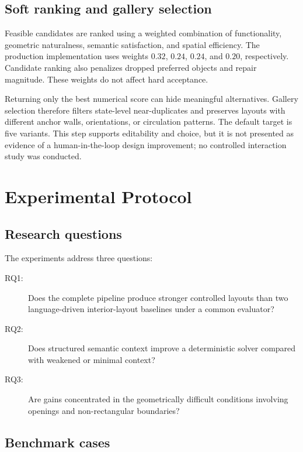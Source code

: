 \documentclass[pdflatex,sn-mathphys-num]{sn-jnl}
\begin{document}
\subsection{Soft ranking and gallery selection}

Feasible candidates are ranked using a weighted combination of functionality, geometric naturalness, semantic satisfaction, and spatial efficiency. The production implementation uses weights \(0.32\), \(0.24\), \(0.24\), and \(0.20\), respectively. Candidate ranking also penalizes dropped preferred objects and repair magnitude. These weights do not affect hard acceptance.

Returning only the best numerical score can hide meaningful alternatives. Gallery selection therefore filters state-level near-duplicates and preserves layouts with different anchor walls, orientations, or circulation patterns. The default target is five variants. This step supports editability and choice, but it is not presented as evidence of a human-in-the-loop design improvement; no controlled interaction study was conducted.

\section{Experimental Protocol}\label{sec:experiments}

\subsection{Research questions}

The experiments address three questions:

\begin{description}
  \item[RQ1:] Does the complete pipeline produce stronger controlled layouts than two language-driven interior-layout baselines under a common evaluator?
  \item[RQ2:] Does structured semantic context improve a deterministic solver compared with weakened or minimal context?
  \item[RQ3:] Are gains concentrated in the geometrically difficult conditions involving openings and non-rectangular boundaries?
\end{description}

\subsection{Benchmark cases}
\end{document}

